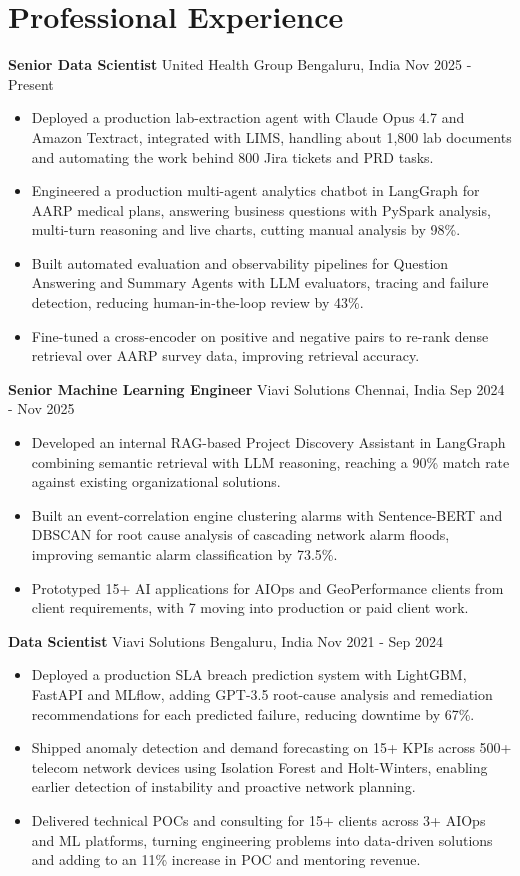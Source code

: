 \documentclass[10pt,a4paper]{article}
\newcommand{\role}[4]{\textbf{#1} \textbar{} #2 \hfill #3 \textbar{} #4\par}
\begin{document}
\section{Professional Experience}
\role{Senior Data Scientist}{United Health Group}{Bengaluru, India}{Nov 2025 - Present}
\begin{itemize}
  \item Deployed a production lab-extraction agent with Claude Opus 4.7 and Amazon Textract, integrated with LIMS, handling about 1,800 lab documents and automating the work behind 800 Jira tickets and PRD tasks.
  \item Engineered a production multi-agent analytics chatbot in LangGraph for AARP medical plans, answering business questions with PySpark analysis, multi-turn reasoning and live charts, cutting manual analysis by 98\%.
  \item Built automated evaluation and observability pipelines for Question Answering and Summary Agents with LLM evaluators, tracing and failure detection, reducing human-in-the-loop review by 43\%.
  \item Fine-tuned a cross-encoder on positive and negative pairs to re-rank dense retrieval over AARP survey data, improving retrieval accuracy.
\end{itemize}
\vspace{3pt}
\role{Senior Machine Learning Engineer}{Viavi Solutions}{Chennai, India}{Sep 2024 - Nov 2025}
\begin{itemize}
  \item Developed an internal RAG-based Project Discovery Assistant in LangGraph combining semantic retrieval with LLM reasoning, reaching a 90\% match rate against existing organizational solutions.
  \item Built an event-correlation engine clustering alarms with Sentence-BERT and DBSCAN for root cause analysis of cascading network alarm floods, improving semantic alarm classification by 73.5\%.
  \item Prototyped 15+ AI applications for AIOps and GeoPerformance clients from client requirements, with 7 moving into production or paid client work.
\end{itemize}
\vspace{3pt}
\role{Data Scientist}{Viavi Solutions}{Bengaluru, India}{Nov 2021 - Sep 2024}
\begin{itemize}
  \item Deployed a production SLA breach prediction system with LightGBM, FastAPI and MLflow, adding GPT-3.5 root-cause analysis and remediation recommendations for each predicted failure, reducing downtime by 67\%.
  \item Shipped anomaly detection and demand forecasting on 15+ KPIs across 500+ telecom network devices using Isolation Forest and Holt-Winters, enabling earlier detection of instability and proactive network planning.
  \item Delivered technical POCs and consulting for 15+ clients across 3+ AIOps and ML platforms, turning engineering problems into data-driven solutions and adding to an 11\% increase in POC and mentoring revenue.
\end{itemize}
\end{document}
